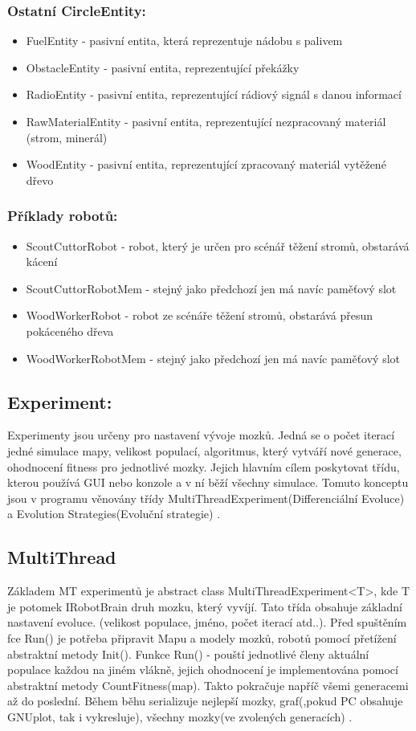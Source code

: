 \documentclass[12pt, oneside]{article}
\begin{document}
\subsubsection{Ostatní CircleEntity: }
\begin{itemize}
\item FuelEntity - pasivní entita, která reprezentuje nádobu s palivem
\item ObstacleEntity - pasivní entita, reprezentující překážky
\item  RadioEntity  - pasivní entita, reprezentující rádiový signál s danou informací 
\item  RawMaterialEntity - pasivní entita, reprezentující nezpracovaný materiál (strom, minerál) 
\item  WoodEntity - pasivní entita, reprezentující zpracovaný materiál vytěžené dřevo
\end{itemize}
\subsubsection{Příklady robotů:}
\begin{itemize}
\item ScoutCuttorRobot - robot, který je určen pro scénář těžení stromů, obstarává kácení
\item ScoutCuttorRobotMem -  stejný jako předchozí jen má navíc paměťový slot
\item WoodWorkerRobot - robot ze scénáře těžení stromů, obstarává přesun pokáceného dřeva 
\item WoodWorkerRobotMem - stejný jako předchozí jen má navíc paměťový slot
\end{itemize}
\newpage 
\subsection{Experiment:}
Experimenty jsou určeny pro nastavení vývoje mozků. Jedná se o počet iterací jedné simulace mapy, velikost populací, algoritmus, který vytváří nové generace, ohodnocení fitness pro jednotlivé mozky. Jejich hlavním cílem poskytovat třídu, kterou používá GUI nebo konzole a v ní běží všechny simulace. Tomuto konceptu jsou v programu věnovány třídy MultiThreadExperiment(Differenciální Evoluce) a Evolution Strategies(Evoluční strategie) . \par
\par
\subsection{MultiThread}
Základem MT experimentů je abstract class MultiThreadExperiment<T>, kde T je potomek IRobotBrain druh mozku, který vyvíjí. Tato třída obsahuje základní nastavení evoluce. (velikost populace, jméno, počet iterací atd..). Před spuštěním fce Run() je potřeba připravit Mapu a modely mozků, robotů pomocí přetížení abstraktní metody Init(). Funkce Run() - pouští jednotlivé členy aktuální populace každou na jiném vlákně, jejich ohodnocení je implementována pomocí abstraktní metody CountFitness(map). Takto pokračuje napříč všemi generacemi až do poslední. Během běhu serializuje nejlepší mozky, graf(,pokud PC obsahuje GNUplot, tak i vykresluje), všechny mozky(ve zvolených generacích) . \\
\end{document}
